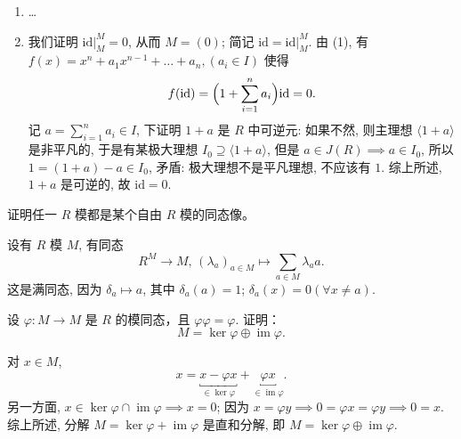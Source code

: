 \begin{vain}
\begin{enumerate}[label=(\arabic*)]
    \item \dots
    \item 我们证明 $\left.{\mathrm{id}}\right|_{M}^{M}=0$, 从而 $M=(0)$; 简记 $\mathrm{id}=\left.{\mathrm{id}}\right|_{M}^{M}$. 由 (1), 有 $f(x) = x^n + a_1 x^{n-1} + \dots + a_n,(a_{i}\in I)$ 使得  
            \[
                f(\mathrm{id})=\Bigl(1+\sum_{i=1}^{n}a_{i}\Bigr)\mathrm{id}=0.
            \]
        记 $a=\sum_{i=1}^{n}a_{i}\in I$, 下证明 $1+a$ 是 $R$ 中可逆元: 如果不然, 则主理想 $ \langle 1+a \rangle  $ 是非平凡的, 
        于是有某极大理想 $I_{0}\supseteq \langle 1+a \rangle$, 但是 $a\in J(R)\implies a\in I_{0}$, 所以 $1=(1+a)-a\in I_{0}$, 
        矛盾: 极大理想不是平凡理想, 不应该有 $1$. 综上所述, $1+a$ 是可逆的, 故 $\mathrm{id}=0$.
    
\end{enumerate}\end{vain}

\setcounter{pb}{5}
\begin{problem}
证明任一 $R$ 模都是某个自由 $R$ 模的同态像。
\end{problem}

\begin{solution}
    设有 $R$ 模 $M$, 有同态 
        \[
            R^{ M}\longrightarrow M,\, (\lambda_{a})_{a\in M}\longmapsto \sum_{a\in M}\lambda_a a.
        \]
    这是满同态, 因为 $\delta_{a}\mapsto a$, 其中 $\delta_{a}(a)=1$; $\delta_{a}(x)=0(\forall x\ne a)$.
\end{solution}

\setcounter{pb}{6}
\begin{problem}
    设 $ \varphi: M \to M $ 是 $ R $ 的模同态，且 $ \varphi \varphi = \varphi $. 
    证明：
    \[
        M = \ker \varphi \oplus \operatorname{im} \varphi.
    \]
\end{problem}

\begin{solution}
    对 $x\in M$, 
        \[
            x=\underbracket{x-\varphi x}_{\in\ker \varphi}+\underbracket{\varphi x}_{\in \operatorname{im}\varphi}.
        \]
    另一方面, $x\in\ker\varphi\cap \operatorname{im}\varphi\implies x=0$; 因为 $x=\varphi y\implies 0=\varphi x=\varphi y\implies 0=x$. 
    综上所述, 分解 $M=\ker\varphi+\operatorname{im}\varphi$ 是直和分解, 即 $M=\ker\varphi\oplus\operatorname{im}\varphi$. 
\end{solution}
    
